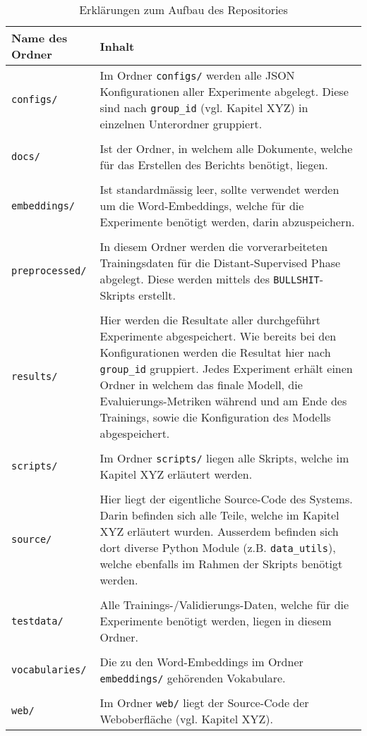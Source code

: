 \begin{table}[H]
  \centering
  \begin{tabularx}{\textwidth}{|l|X|}
    \toprule
    Name des Ordner & Inhalt\\ \midrule
    \texttt{configs/} & Im Ordner \texttt{configs/} werden alle JSON Konfigurationen aller Experimente abgelegt. Diese sind nach \texttt{group{\_}id} (vgl. Kapitel XYZ) in einzelnen Unterordner gruppiert.\\\\
    \texttt{docs/} & Ist der Ordner, in welchem alle Dokumente, welche für das Erstellen des Berichts benötigt, liegen.\\\\
    \texttt{embeddings/} & Ist standardmässig leer, sollte verwendet werden um die Word-Embeddings, welche für die Experimente benötigt werden, darin abzuspeichern.\\\\
    \texttt{preprocessed/} & In diesem Ordner werden die vorverarbeiteten Trainingsdaten für die Distant-Supervised Phase abgelegt. Diese werden mittels des \texttt{BULLSHIT}-Skripts erstellt.\\\\
    \texttt{results/} & Hier werden die Resultate aller durchgeführt Experimente abgespeichert. Wie bereits bei den Konfigurationen werden die Resultat hier nach \texttt{group{\_}id} gruppiert. Jedes Experiment erhält einen Ordner in welchem das finale Modell, die Evaluierungs-Metriken während und am Ende des Trainings, sowie die Konfiguration des Modells abgespeichert.\\\\
    \texttt{scripts/} & Im Ordner \texttt{scripts/} liegen alle Skripts, welche im Kapitel XYZ erläutert werden.\\\\
    \texttt{source/} & Hier liegt der eigentliche Source-Code des Systems. Darin befinden sich alle Teile, welche im Kapitel XYZ erläutert wurden. Ausserdem befinden sich dort diverse Python Module (z.B. \texttt{data{\_}utils}), welche ebenfalls im Rahmen der Skripts benötigt werden.\\\\
    \texttt{testdata/} & Alle Trainings-/Validierungs-Daten, welche für die Experimente benötigt werden, liegen in diesem Ordner.\\\\
    \texttt{vocabularies/} & Die zu den Word-Embeddings im Ordner \texttt{embeddings/} gehörenden Vokabulare.\\\\
    \texttt{web/} & Im Ordner \texttt{web/} liegt der Source-Code der Weboberfläche (vgl. Kapitel XYZ).\\
    \bottomrule
  \end{tabularx}
  \caption{Erklärungen zum Aufbau des Repositories}
\end{table}

